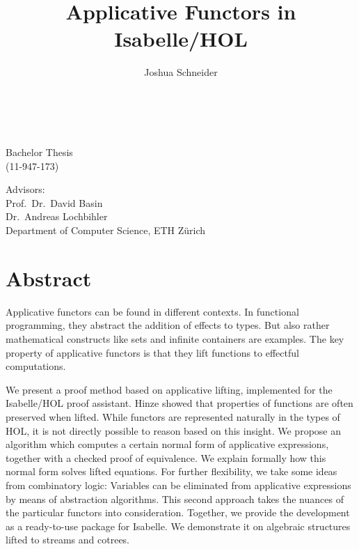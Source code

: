 \documentclass[a4paper,draft]{article}
\title{Applicative Functors in Isabelle/HOL}
\author{Joshua Schneider}
\numberwithin{equation}{section}
\begin{document}
\begin{titlepage}\sf\large\raggedleft
\makeatletter
{\huge\bfseries\@title} \\
\vspace{7mm}
{\Large\@author} \\
\vspace{2cm}
Bachelor Thesis \\
(11-947-173) \\
\vspace{7mm}
\@date
\makeatother

\vspace{\fill}
Advisors: \\
Prof.\ Dr.\ David Basin \\
Dr.\ Andreas Lochbihler \\
\vspace{1cm}
Department of Computer Science, ETH Zürich
\end{titlepage}

\section*{Abstract}

Applicative functors can be found in different contexts.
In functional programming, they abstract the addition of effects to types.
But also rather mathematical constructs like sets and infinite containers
are examples.
The key property of applicative functors is that they lift functions
to effectful computations.

We present a proof method based on applicative lifting, implemented for the
Isabelle/HOL proof assistant.
Hinze showed that properties of functions are often preserved when lifted.
While functors are represented naturally in the types of HOL, it is not
directly possible to reason based on this insight.
We propose an algorithm which computes a certain normal form of applicative
expressions, together with a checked proof of equivalence.
We explain formally how this normal form solves lifted equations.
For further flexibility, we take some ideas from combinatory logic:
Variables can be eliminated from applicative expressions by means of abstraction
algorithms.
This second approach takes the nuances of the particular functors into
consideration.
Together, we provide the development as a ready-to-use package for Isabelle.
We demonstrate it on algebraic structures lifted to streams and cotrees.


\pagebreak
\tableofcontents
\pagebreak






\pagebreak
\printbibliography
\end{document}
